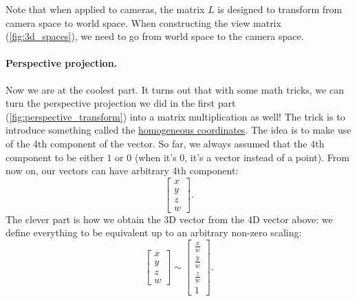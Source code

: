 Note that when applied to cameras, the matrix $L$ is designed to transform from camera space to world space. When constructing the view matrix (\cref{fig:3d_spaces}), we need to go from world space to the camera space. 

\paragraph{Perspective projection.}
Now we are at the coolest part. It turns out that with some math tricks, we can turn the perspective projection we did in the first part (\cref{fig:perspective_transform}) into a matrix multiplication as well! The trick is to introduce something called the \href{https://en.wikipedia.org/wiki/Homogeneous_coordinates}{homogeneous coordinates}. The idea is to make use of the 4th component of the vector. So far, we always assumed that the 4th component to be either $1$ or $0$ (when it's $0$, it's a vector instead of a point). From now on, our vectors can have arbitrary 4th component:
\begin{equation}
\begin{bmatrix}
x \\
y \\
z \\
w
\end{bmatrix}.
\end{equation}
The clever part is how we obtain the 3D vector from the 4D vector above: we define everything to be equivalent up to an arbitrary non-zero scaling:
\begin{equation}
\begin{bmatrix}
x \\
y \\
z \\
w
\end{bmatrix} \sim
\begin{bmatrix}
\frac{x}{w} \\
\frac{y}{w} \\
\frac{z}{w} \\
1
\end{bmatrix}.
\end{equation}

